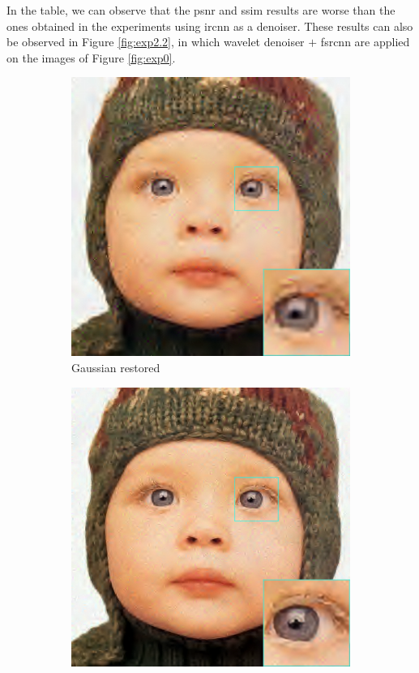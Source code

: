In the table, we can observe that the \gls{psnr} and \gls{ssim} results are worse than the ones obtained in the experiments using \gls{ircnn} as a denoiser. These results can also be observed in Figure \ref{fig:exp2.2}, in which wavelet denoiser $+$ \gls{fsrcnn} are applied on the images of Figure \ref{fig:exp0}.

\begin{figure}
	\centering
	\begin{subfigure}{0.24\textwidth}
		\includegraphics[width=\textwidth]{images/exp2.2/gaussian.png}
		\caption{Gaussian restored}
	\end{subfigure}
	\begin{subfigure}{0.24\textwidth}
		\includegraphics[width=\textwidth]{images/exp2.2/poisson.png}

\end{subfigure}
\end{figure}
